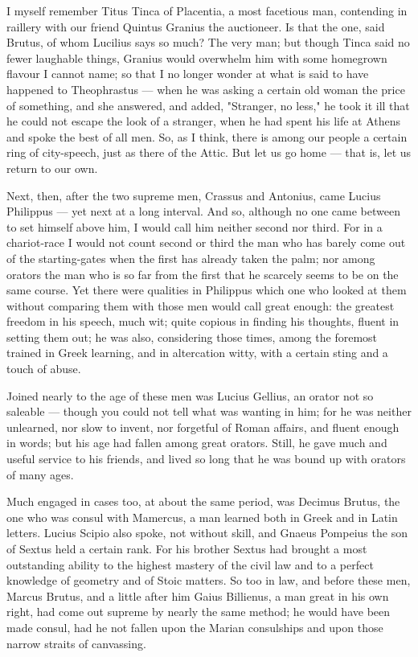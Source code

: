  I myself remember Titus Tinca of Placentia, a most facetious man, contending in raillery with our friend Quintus Granius the auctioneer. Is that the one, said Brutus, of whom Lucilius says so much? The very man; but though Tinca said no fewer laughable things, Granius would overwhelm him with some homegrown flavour I cannot name; so that I no longer wonder at what is said to have happened to Theophrastus — when he was asking a certain old woman the price of something, and she answered, and added, "Stranger, no less," he took it ill that he could not escape the look of a stranger, when he had spent his life at Athens and spoke the best of all men. So, as I think, there is among our people a certain ring of city-speech, just as there of the Attic. But let us go home — that is, let us return to our own.

 Next, then, after the two supreme men, Crassus and Antonius, came Lucius Philippus — yet next at a long interval. And so, although no one came between to set himself above him, I would call him neither second nor third. For in a chariot-race I would not count second or third the man who has barely come out of the starting-gates when the first has already taken the palm; nor among orators the man who is so far from the first that he scarcely seems to be on the same course. Yet there were qualities in Philippus which one who looked at them without comparing them with those men would call great enough: the greatest freedom in his speech, much wit; quite copious in finding his thoughts, fluent in setting them out; he was also, considering those times, among the foremost trained in Greek learning, and in altercation witty, with a certain sting and a touch of abuse.

 Joined nearly to the age of these men was Lucius Gellius, an orator not so saleable — though you could not tell what was wanting in him; for he was neither unlearned, nor slow to invent, nor forgetful of Roman affairs, and fluent enough in words; but his age had fallen among great orators. Still, he gave much and useful service to his friends, and lived so long that he was bound up with orators of many ages.

 Much engaged in cases too, at about the same period, was Decimus Brutus, the one who was consul with Mamercus, a man learned both in Greek and in Latin letters. Lucius Scipio also spoke, not without skill, and Gnaeus Pompeius the son of Sextus held a certain rank. For his brother Sextus had brought a most outstanding ability to the highest mastery of the civil law and to a perfect knowledge of geometry and of Stoic matters. So too in law, and before these men, Marcus Brutus, and a little after him Gaius Billienus, a man great in his own right, had come out supreme by nearly the same method; he would have been made consul, had he not fallen upon the Marian consulships and upon those narrow straits of canvassing.

